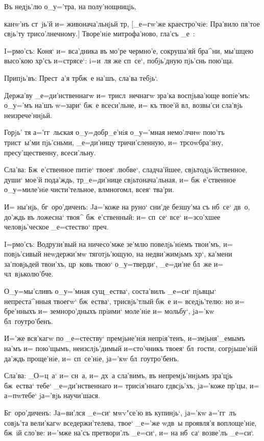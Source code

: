 Въ недjь'лю о_у='тра, на полу'нощницjь,

канw'нъ ст~jь'й и= живонача'льнjьй тр, [_е=гw'же 
краестро'чiе: Пра'вило пя'тое свjь'ту трисо'лнечному.] 
Творе'нiе митрофа'ново, гла'съ _е~:


I=рмо'съ: Коня` и= вса'дника въ мо'ре чермно'е, 
сокруша'яй бра^ни, мы'шцею высо'кою хр'съ и=стрясе`: 
i=и~ля же сп~се`, побjь'дную пjь'снь пою'ща.

Припjь'въ: Прест~а'я тр бж~е на'шъ, сла'ва тебjь`. 

Держа'ву _е=ди'нственнагw и= трисл~нечнагw зра'ка 
воспjьва'юще вопiе'мъ: о_у='мъ на'шъ w=зари` бж~е 
всеси'льне, и= къ твое'й вл, возвы'си сла'вjь 
неизрече'ннjьй.

Горjь' тя а='гг~льская о_у=добр_е'нiя о_у='мная 
немо'лчнw пою'тъ трист~ы'ми пjь'сньми, _е=ди'ницу 
тричи'сленную, и= тр соwбра'зну, пресу'щественну, 
всеси'льну.

Сла'ва: Бж~е'ственное питiе` твоея` любве`, 
сладча'йшее, свjьтодjь'йственное, души` мое'й пода'ждь, 
тр _е=ди'нице свjьтонача'льная, и= бж~е'ственное 
о_у=миле'нiе чисти'тельное, вл многомл, всея` 
тва'ри.

И= ны'нjь, бг~оро'диченъ: Jа='коже на руно` сни'де 
без\ъ шу'ма съ нб~се` дв~о, до'ждь въ ложесна` твоя^ 
бж~е'ственный: и= сп~се` все` и=зсо'хшее человjь'ческое 
_е=стество` преч.


I=рмо'съ: Водрузи'вый на ничесо'мже зе'млю 
повелjь'нiемъ твои'мъ, и= повjь'сивый неwдержи'мw 
тяготjь'ющую, на недви'жимjьмъ хр`, ка'мени 
за'повjьдей твои'хъ, цр~ковь твою` о_у=тверди`, _е=ди'не 
бл~же и= чл~вjьколю'бче.

О_у=мы'сливъ о_у='мная сущ_ества`, соста'вилъ _е=си` 
пjьвцы` непреста^нныя твоегw` бж~ества`, трисвjь'тлый 
бж~е и= вседjь'телю: но и= бре'нныхъ и= земноро'дныхъ 
прiими` моле'нiе и= мольбу`, jа='кw бл~гоутро'бенъ.

И='же вся'кагw по _е=стеству` премjьне'нiя 
непрiя'тенъ, и=змjьня'_емымъ на'мъ и= пою'щымъ, 
неизслjь'димый и=сто'чникъ твоея` бл~гости, согрjьше'нiй 
да'ждь проще'нiе, и= сп~се'нiе, jа='кw бл~гоутро'бенъ.

Сла'ва: _О=ц~а` и= сн~а, и= дх~а сла'вимъ, въ 
непремjь'ннjьмъ зра'цjь бж~ества` тебе` _е=ди'нственнаго 
и= трисiя'ннаго гд всjь'хъ, jа='коже пр'цы, и= 
а=п w\т тебе` jа='вjь научи'шася. 

Бг~оро'диченъ: Jа=ви'лся _е=си` мwv"се'ю въ купинjь`, 
jа='кw а='гг~лъ совjь'та вели'кагw вседержи'телева, твое` 
_е='же w\т дв~ы проявля'я воплоще'нiе, бж~iй сло'ве: 
и='мже на'съ претвори'лъ _е=си`, и= на нб~са` возве'лъ 
_е=си`.


